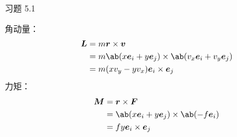 \begin{problem}
    习题 5.1
    \begin{solution}
        角动量：
        $$
        \begin{aligned}
            \vect{L} & = m \vect{r} \times \vect{v} \\
            & = m \ab(x \vect{e}_i + y \vect{e}_j) \times \ab(v_x \vect{e}_i + v_y \vect{e}_j) \\
            & = m (x v_y - y v_x) \vect{e}_i \times \vect{e}_j
        \end{aligned}
        $$
        力矩：
        $$
        \begin{aligned}
            \vect{M} & = \vect{r} \times \vect{F} \\
            & = \ab(x \vect{e}_i + y \vect{e}_j) \times \ab(-f \vect{e}_i) \\
            & = f y \vect{e}_i \times \vect{e}_j
        \end{aligned}
        $$
    \end{solution}
\end{problem}

